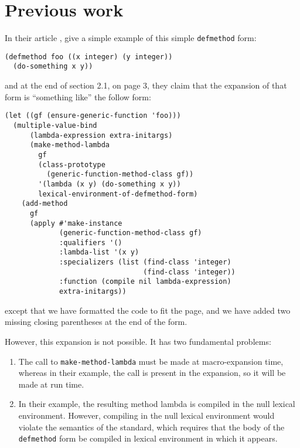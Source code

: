 \section{Previous work}

In their article \cite{Constanza:2008}, \cnh{} give a
simple example of this simple \texttt{defmethod} form:

\begin{verbatim}
(defmethod foo ((x integer) (y integer))
  (do-something x y))
\end{verbatim}

\noindent
and at the end of section 2.1, on page 3, they claim that the
expansion of that form is ``something like'' the follow form:

{\small\begin{verbatim}
(let ((gf (ensure-generic-function 'foo)))
  (multiple-value-bind
      (lambda-expression extra-initargs)
      (make-method-lambda
        gf
        (class-prototype
          (generic-function-method-class gf))
        '(lambda (x y) (do-something x y))
        lexical-environment-of-defmethod-form)
    (add-method
      gf
      (apply #'make-instance
             (generic-function-method-class gf)
             :qualifiers '()
             :lambda-list '(x y)
             :specializers (list (find-class 'integer)
                                 (find-class 'integer))
             :function (compile nil lambda-expression)
             extra-initargs))
\end{verbatim}}

\noindent
except that we have formatted the code to fit the page, and we have
added two missing closing parentheses at the end of the form.

However, this expansion is not possible.  It has two fundamental
problems:

\begin{enumerate}
\item The call to \texttt{make-method-lambda} must be made at
  macro-expansion time, whereas in their example, the call is present
  in the expansion, so it will be made at run time.
\item In their example, the resulting method lambda is compiled in the
  null lexical environment.  However, compiling in the null lexical
  environment would violate the semantics of the \commonlisp{}
  standard, which requires that the body of the \texttt{defmethod}
  form be compiled in lexical environment in which it appears.
\end{enumerate}


